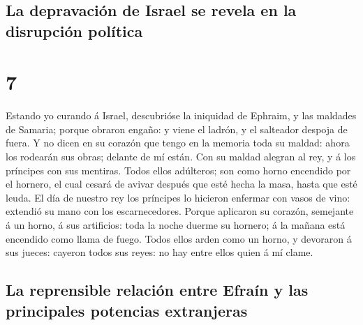 \hypertarget{la-depravaciuxf3n-de-israel-se-revela-en-la-disrupciuxf3n-poluxedtica}{%
\subsection{La depravación de Israel se revela en la disrupción
política}\label{la-depravaciuxf3n-de-israel-se-revela-en-la-disrupciuxf3n-poluxedtica}}

\hypertarget{section-6}{%
\section{7}\label{section-6}}

 Estando yo curando á Israel, descubrióse la iniquidad de
Ephraim, y las maldades de Samaria; porque obraron engaño: y viene el
ladrón, y el salteador despoja de fuera.  Y no dicen en su
corazón que tengo en la memoria toda su maldad: ahora los rodearán sus
obras; delante de mí están.  Con su maldad alegran al rey,
y á los príncipes con sus mentiras.  Todos ellos
adúlteros; son como horno encendido por el hornero, el cual cesará de
avivar después que esté hecha la masa, hasta que esté leuda.
 El día de nuestro rey los príncipes lo hicieron enfermar
con vasos de vino: extendió su mano con los escarnecedores.
 Porque aplicaron su corazón, semejante á un horno, á sus
artificios: toda la noche duerme su hornero; á la mañana está encendido
como llama de fuego.  Todos ellos arden como un horno, y
devoraron á sus jueces: cayeron todos sus reyes: no hay entre ellos
quien á mí clame.

\hypertarget{la-reprensible-relaciuxf3n-entre-efrauxedn-y-las-principales-potencias-extranjeras}{%
\subsection{La reprensible relación entre Efraín y las principales
potencias
extranjeras}\label{la-reprensible-relaciuxf3n-entre-efrauxedn-y-las-principales-potencias-extranjeras}}

